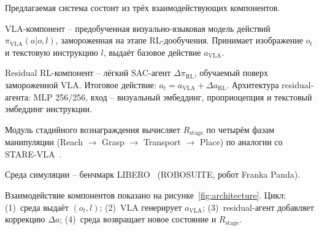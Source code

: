     Предлагаемая система состоит из трёх взаимодействующих компонентов.

    VLA-компонент -- предобученная визуально-языковая модель действий $\pi_{\text{VLA}}(a|o, l)$, замороженная на этапе RL-дообучения. Принимает изображение $o_t$ и текстовую инструкцию $l$, выдаёт базовое действие $a_{\text{VLA}}$.

    Residual RL-компонент -- лёгкий SAC-агент $\Delta\pi_{\text{RL}}$, обучаемый поверх замороженной VLA. Итоговое действие: $a_t = a_{\text{VLA}} + \Delta a_{\text{RL}}$. Архитектура residual-агента: MLP 256/256, вход -- визуальный эмбеддинг, проприоцепция и текстовый эмбеддинг инструкции.

    Модуль стадийного вознаграждения вычисляет $R_{\text{stage}}$ по четырём фазам манипуляции (Reach $\to$ Grasp $\to$ Transport $\to$ Place) по аналогии со STARE-VLA~\cite{starevla2025}.

    Среда симуляции -- бенчмарк LIBERO~\cite{liu2023libero} (ROBOSUITE, робот Franka Panda).

    Взаимодействие компонентов показано на рисунке~\ref{fig:architecture}. Цикл: (1)~среда выдаёт $(o_t, l)$; (2)~VLA генерирует $a_{\text{VLA}}$; (3)~residual-агент добавляет коррекцию $\Delta a$; (4)~среда возвращает новое состояние и $R_{\text{stage}}$.

